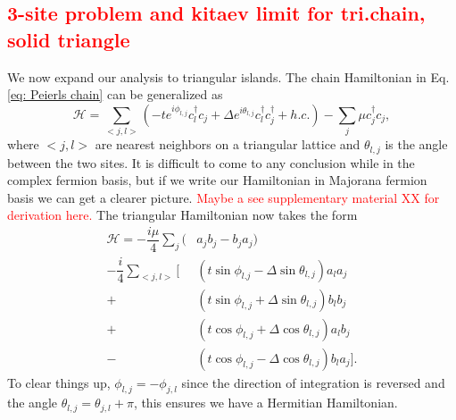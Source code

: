 \documentclass[aps,prb,showpacs,twocolumn,amsmath,amssymb,superscriptaddress]{revtex4-2}
\newcommand{\Red}[1]{\textcolor{red}{#1}}
\newcommand{\Ham}{\mathcal{H}}
\newcommand{\cc}{c^{\dagger}}
\newcommand{\de}{\Delta}
\begin{document}
\subsection{\Red{3-site problem and kitaev limit for tri.chain, solid triangle}}
We now expand our analysis to triangular islands.
The chain Hamiltonian in Eq. \ref{eq: Peierls chain} can be generalized as
\begin{equation} \label{eq: Peierls triangle}
  \Ham = \sum_{<j,l>} (-t e^{i\phi_{l,j}} \cc_{l} c_j + \de e^{i\theta_{l,j}} \cc_{l}\cc_j + h.c.) - \sum_j \mu \cc_j c_j,
\end{equation}
where $<j,l>$ are nearest neighbors on a triangular lattice and $\theta_{l,j}$ is the angle between the two sites.
It is difficult to come to any conclusion while in the complex fermion basis, but if we write our Hamiltonian in Majorana fermion basis we can get a clearer picture.
\Red{Maybe a see supplementary material XX for derivation here.}
The triangular Hamiltonian now takes the form
\begin{align}
  \Ham = -\dfrac{i\mu}{4} \sum_j (& a_j b_j - b_j a_j) \nonumber \\
  -\dfrac{i}{4} \sum_{<j,l>} [&(t\sin\phi_{l.j}-\de\sin\theta_{l,j}) a_l a_j \nonumber \\
  +&(t\sin\phi_{l,j}+\de\sin\theta_{l,j}) b_l b_j \nonumber \\
  +&(t\cos\phi_{l,j}+\de\cos\theta_{l,j}) a_l b_j \nonumber \\
  -&(t\cos\phi_{l,j}-\de\cos\theta_{l,j}) b_l a_j].
\end{align}
To clear things up, $\phi_{l,j} = -\phi_{j,l}$ since the direction of integration is reversed and the angle $\theta_{l,j} = \theta_{j,l} + \pi$, this ensures we have a Hermitian Hamiltonian.
\end{document}
